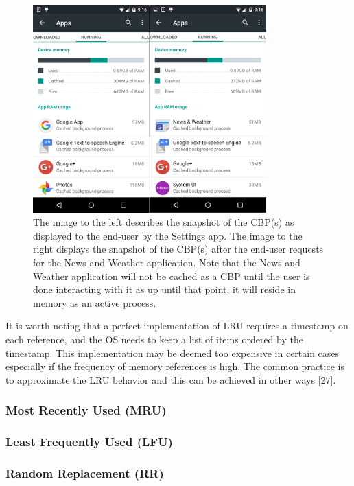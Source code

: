 \documentclass[12pt]{uthesis-v12}  %
\begin{document}
				\begin{figure}[!ht]
					\centering
					\includegraphics[width = 90mm]{images/beforeAndAfterNews.png}
					\caption[Before \& After News App Launch]
					{The image to the left describes the snapshot of the CBP(s) as displayed to the end-user by the Settings app. The image to the right displays the snapshot of the CBP(s) after the end-user requests for the News and Weather application. Note that the News and Weather application will not be cached as a CBP until the user is done interacting with it as up until that point, it will reside in memory as an active process.}
				\end{figure}				
				
				It is worth noting that a perfect implementation of LRU requires a timestamp on each reference, and the OS needs to keep a list of items ordered by the timestamp. This implementation may be deemed too expensive in certain cases especially if the frequency of memory references is high. The common practice is to approximate the LRU behavior and this can be achieved in other ways [27]. 
			\subsubsection{Most Recently Used (MRU)}
			
			\subsubsection{Least Frequently Used (LFU)}
			
			\subsubsection{Random Replacement (RR)}
			
\end{document}
